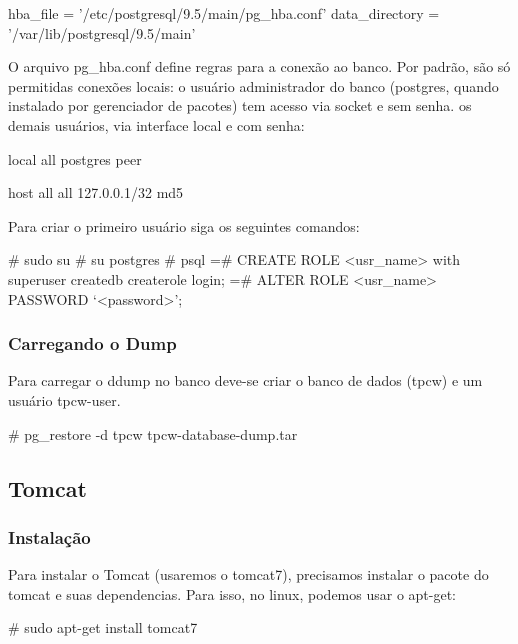 \documentclass[a4paper,10pt]{article}
\begin{document}
        \begin{spverbatim}
        hba_file = '/etc/postgresql/9.5/main/pg_hba.conf'
        data_directory = '/var/lib/postgresql/9.5/main'
        \end{spverbatim}

        O arquivo pg\_hba.conf define regras para a conexão ao banco. Por padrão, são só permitidas conexões locais: o usuário administrador do banco (postgres, quando instalado por gerenciador de pacotes) tem acesso via socket e sem senha. os demais usuários, via interface local e com senha:
        \begin{spverbatim}
        local   all         postgres            peer

        host    all         all         127.0.0.1/32            md5
        \end{spverbatim}

    Para criar o primeiro usuário siga os seguintes comandos:
        \begin{spverbatim}
            # sudo su
            # su postgres
            # psql
            =# CREATE ROLE <usr_name> with superuser createdb createrole login;
            =# ALTER ROLE <usr_name> PASSWORD ‘<password>’;
        \end{spverbatim}

        \subsubsection{Carregando o Dump}
        Para carregar o ddump no banco deve-se criar o banco de dados (tpcw) e um usuário tpcw-user.
        \begin{spverbatim}
        # pg_restore -d tpcw tpcw-database-dump.tar
        \end{spverbatim}


    \subsection{Tomcat}
        \subsubsection{Instalação}
        Para instalar o Tomcat (usaremos o tomcat7), precisamos instalar o pacote do tomcat e suas dependencias. Para isso, no linux, podemos usar o apt-get:
        \begin{spverbatim}
        # sudo apt-get install tomcat7
        \end{spverbatim}
\end{document}
